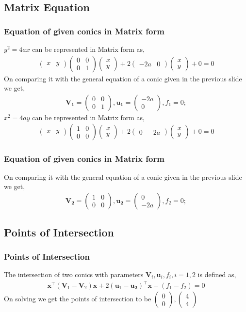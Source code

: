 \documentclass{beamer}
\providecommand{\brak}[1]{\ensuremath{\left(#1\right)}}
\theoremstyle{remark}
\newcommand{\myvec}[1]{\ensuremath{\begin{pmatrix}#1\end{pmatrix}}}
\let\vec\mathbf
\numberwithin{equation}{section}
\begin{document}
		\subsection{Matrix Equation}
		\begin{frame}
			\frametitle{Equation of given conics in Matrix form}
			$y^2=4ax$ can be represented in Matrix form as,
			\begin{align}
				\myvec{x&y}\myvec{0&0\\0&1}\myvec{x\\y}+2\myvec{-2a & 0}\myvec{x\\y}+0=0
			\end{align}
			On comparing it with the general equation of a conic given in the previous slide we get,
			\begin{align}
				\vec{V_1}=\myvec{0&0\\0&1}, \vec{u_1}=\myvec{-2a\\0}, f_1=0;
			\end{align}
			$x^2=4ay$ can be represented in Matrix form as,			
			\begin{align}
				\myvec{x&y}\myvec{1&0\\0&0}\myvec{x\\y}+2\myvec{0 & -2a}\myvec{x\\y}+0=0
			\end{align}
		\end{frame}
		\begin{frame}
			\frametitle{Equation of given conics in Matrix form}
			On comparing it with the general equation of a conic given in the previous slide we get,
			\begin{align}
				\vec{V_2}=\myvec{1&0\\0&0}, \vec{u_2}=\myvec{0\\-2a}, f_2=0;
			\end{align}
		\end{frame}
		\subsection{Points of Intersection}
		\begin{frame}
			\frametitle{Points of Intersection}
			The intersection of two conics with parameters $\vec{V}_i,\vec{u}_i,f_i, i=1,2$ is defined as,
			\begin{align}
				\vec{x}^{\top}\brak{\vec{V}_1-\vec{V}_2}\vec{x}+2\brak{\vec{u}_1-\vec{u_2}}^{\top}\vec{x}+\brak{f_1-f_2}=0
			\end{align} 
			On solving we get the points of intersection to be $\myvec{0\\0},\myvec{4\\4}$
		\end{frame}
\end{document}
